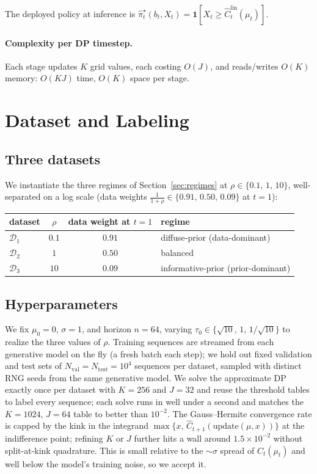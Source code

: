 \documentclass[11pt]{article}
\begin{document}
\noindent The deployed policy at inference is $\widehat\pi^\star_t(b_t, X_t) = \mathbf{1}[X_t \ge \widehat{C}_t^{\mathrm{lin}}(\mu_t)]$.

\paragraph{Complexity per DP timestep.} Each stage updates $K$ grid values, each costing $O(J)$, and reads/writes $O(K)$ memory: $O(KJ)$ time, $O(K)$ space per stage.

\section{Dataset and Labeling}
\label{sec:dataset}

\subsection{Three datasets}

We instantiate the three regimes of Section~\ref{sec:regimes} at $\rho \in \{0.1,\, 1,\, 10\}$, well-separated on a log scale (data weights $\frac{1}{1+\rho} \in \{0.91,\, 0.50,\, 0.09\}$ at $t = 1$):
\begin{center}
\small
\begin{tabular}{l c c l}
\hline
dataset & $\rho$ & data weight at $t=1$ & regime \\
\hline
$\mathcal{D}_1$ & $0.1$ & $0.91$ & diffuse-prior (data-dominant) \\
$\mathcal{D}_2$ & $1$   & $0.50$ & balanced \\
$\mathcal{D}_3$ & $10$  & $0.09$ & informative-prior (prior-dominant) \\
\hline
\end{tabular}
\end{center}

\subsection{Hyperparameters}

We fix $\mu_0 = 0$, $\sigma = 1$, and horizon $n = 64$, varying $\tau_0 \in \{\sqrt{10},\, 1,\, 1/\sqrt{10}\}$ to realize the three values of $\rho$. Training sequences are streamed from each generative model on the fly (a fresh batch each step); we hold out fixed validation and test sets of $N_{\mathrm{val}} = N_{\mathrm{test}} = 10^4$ sequences per dataset, sampled with distinct RNG seeds from the same generative model. We solve the approximate DP exactly once per dataset with $K = 256$ and $J = 32$ and reuse the threshold tables to label every sequence; each solve runs in well under a second and matches the $K = 1024,\, J = 64$ table to better than $10^{-2}$. The Gauss--Hermite convergence rate is capped by the kink in the integrand $\max\{x,\, \widehat{C}_{t+1}(\mathrm{update}(\mu, x))\}$ at the indifference point; refining $K$ or $J$ further hits a wall around $1.5 \times 10^{-2}$ without split-at-kink quadrature. This is small relative to the $\sim\sigma$ spread of $C_t(\mu_t)$ and well below the model's training noise, so we accept it.
\end{document}
